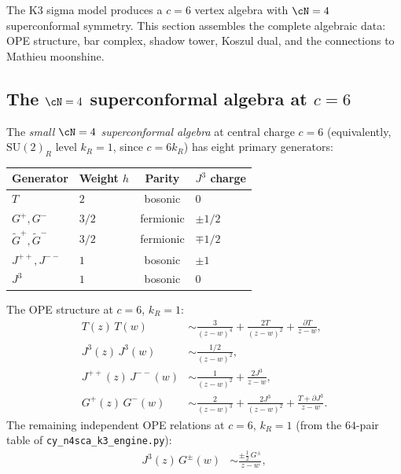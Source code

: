 The K3 sigma model produces a $c = 6$ vertex algebra with $\cN = 4$
superconformal symmetry. This section assembles the complete
algebraic data: OPE structure, bar complex, shadow tower,
Koszul dual, and the connections to Mathieu moonshine.

\subsection{The $\cN = 4$ superconformal algebra at $c = 6$}
\label{subsec:n4-sca}

\begin{definition}[Small $\cN = 4$ SCA at $c = 6$]
\label{def:n4-sca-c6}
The \emph{small $\cN = 4$ superconformal algebra} at central
charge $c = 6$ (equivalently, $\mathrm{SU}(2)_R$ level
$k_R = 1$, since $c = 6k_R$) has eight primary generators:
\begin{center}
\small
\renewcommand{\arraystretch}{1.2}
\begin{tabular}{llcl}
\textbf{Generator} & \textbf{Weight $h$} & \textbf{Parity}
 & $J^3$ \textbf{charge} \\
\hline
$T$ & $2$ & bosonic & $0$ \\
$G^+, G^-$ & $3/2$ & fermionic & $\pm 1/2$ \\
$\tilde{G}^+, \tilde{G}^-$ & $3/2$ & fermionic & $\mp 1/2$ \\
$J^{++}, J^{--}$ & $1$ & bosonic & $\pm 1$ \\
$J^3$ & $1$ & bosonic & $0$
\end{tabular}
\end{center}
The OPE structure at $c = 6$, $k_R = 1$:
\begin{align}
T(z)\,T(w) &\sim \frac{3}{(z-w)^4} + \frac{2T}{(z-w)^2}
 + \frac{\partial T}{z-w}, \label{eq:n4-TT} \\
J^3(z)\,J^3(w) &\sim \frac{1/2}{(z-w)^2}, \label{eq:n4-J3J3} \\
J^{++}(z)\,J^{--}(w) &\sim \frac{1}{(z-w)^2}
 + \frac{2J^3}{z-w}, \label{eq:n4-JppJmm} \\
G^+(z)\,G^-(w) &\sim \frac{2}{(z-w)^3} + \frac{2J^3}{(z-w)^2}
 + \frac{T + \partial J^3}{z-w}. \label{eq:n4-GpGm}
\end{align}
The remaining independent OPE relations at $c = 6$, $k_R = 1$
\textup{(}from the $64$-pair table of \texttt{cy\_n4sca\_k3\_engine.py}\textup{)}:
\begin{align}
J^3(z)\,G^\pm(w) &\sim \frac{\pm\tfrac{1}{2}\,G^\pm}{z-w}, \label{eq:n4-J3Gpm} \\

\end{align}
\end{definition}

